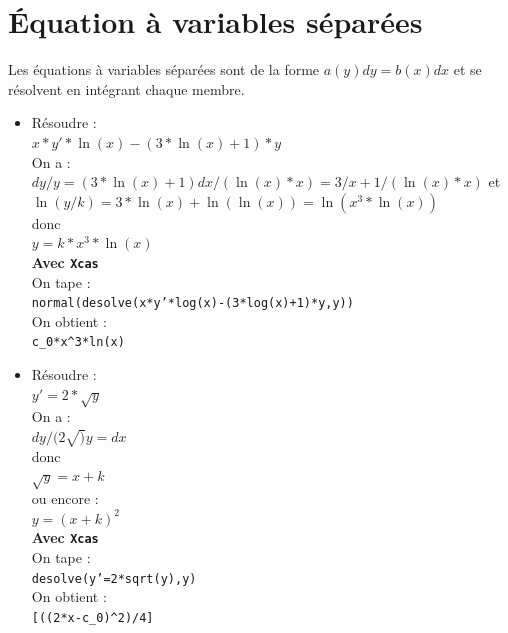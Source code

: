 \documentclass[a4paper,11pt]{book}
\begin{document}
\section{\'Equation \`a variables s\'epar\'ees}
Les \'equations \`a variables s\'epar\'ees sont de la forme $a(y)dy=b(x)dx$ et 
se r\'esolvent en int\'egrant chaque membre.
\begin{itemize}
\item  R\'esoudre :\\
$x*y'*\ln(x)-(3*\ln(x)+1)*y$\\
On a :\\
$dy/y=(3*\ln(x)+1)dx/(\ln(x)*x)=3/x+1/(\ln(x)*x)$ et\\
$\ln(y/k)=3*\ln(x)+\ln(\ln(x))=\ln(x^3*\ln(x))$\\
donc\\
$y=k*x^3*\ln(x)$ \\
{\bf Avec {\tt Xcas}}\\
On tape :\\
{\tt normal(desolve(x*y'*log(x)-(3*log(x)+1)*y,y))}\\
On obtient :\\
{\tt c\_0*x\verb|^|3*ln(x)}\\

\item  R\'esoudre :\\
$y'=2*\sqrt y$\\
On a :\\
$dy/(2\sqrt) y=dx$\\
donc \\
$\sqrt y=x+k$\\
ou encore :\\
$y=(x+k)^2$\\
{\bf Avec {\tt Xcas}}\\
On tape :\\
{\tt desolve(y'=2*sqrt(y),y)}\\
On obtient :\\
{\tt [((2*x-c\_0)\verb|^|2)/4]}
\end{itemize}
\end{document}
